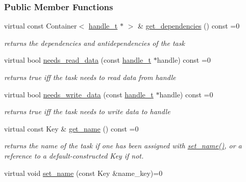 \subsubsection*{Public Member Functions}
\begin{DoxyCompactItemize}
\item 
virtual const Container$<$ \hyperlink{classdarma__runtime_1_1abstract_1_1frontend_1_1_dependency_handle}{handle\+\_\+t} $\ast$ $>$ \& \hyperlink{classdarma__runtime_1_1abstract_1_1frontend_1_1_task_adbe380f89b64b6a60278ab5a62f96c06}{get\+\_\+dependencies} () const  =0
\begin{DoxyCompactList}\small\item\em returns the dependencies and antidependencies of the task \end{DoxyCompactList}\item 
virtual bool \hyperlink{classdarma__runtime_1_1abstract_1_1frontend_1_1_task_a1cf2e35fe4770026d6039a06ca95c587}{needs\+\_\+read\+\_\+data} (const \hyperlink{classdarma__runtime_1_1abstract_1_1frontend_1_1_dependency_handle}{handle\+\_\+t} $\ast$handle) const  =0
\begin{DoxyCompactList}\small\item\em returns true iff the task needs to read data from handle \end{DoxyCompactList}\item 
virtual bool \hyperlink{classdarma__runtime_1_1abstract_1_1frontend_1_1_task_a17a3f093c6cf7d8f591a83a044de7e41}{needs\+\_\+write\+\_\+data} (const \hyperlink{classdarma__runtime_1_1abstract_1_1frontend_1_1_dependency_handle}{handle\+\_\+t} $\ast$handle) const  =0
\begin{DoxyCompactList}\small\item\em returns true iff the task needs to write data to handle \end{DoxyCompactList}\item 
virtual const Key \& \hyperlink{classdarma__runtime_1_1abstract_1_1frontend_1_1_task_aab93fdc54c8b6b1ba7214dc849633201}{get\+\_\+name} () const  =0
\begin{DoxyCompactList}\small\item\em returns the name of the task if one has been assigned with \hyperlink{classdarma__runtime_1_1abstract_1_1frontend_1_1_task_a57f64c02eb91a69fa4167a420392ce3b}{set\+\_\+name()}, or a reference to a default-\/constructed Key if not. \end{DoxyCompactList}\item 
virtual void \hyperlink{classdarma__runtime_1_1abstract_1_1frontend_1_1_task_a57f64c02eb91a69fa4167a420392ce3b}{set\+\_\+name} (const Key \&name\+\_\+key)=0

\end{DoxyCompactItemize}
